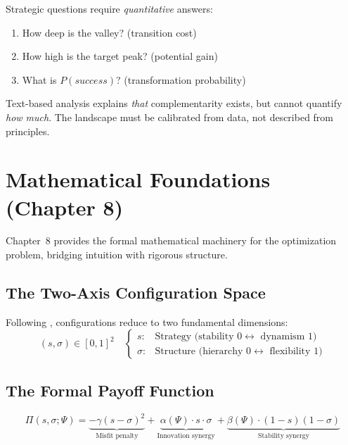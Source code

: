 Strategic questions require \textit{quantitative} answers:
\begin{enumerate}[nosep]
\item How deep is the valley? (transition cost)
\item How high is the target peak? (potential gain)
\item What is $P(success)$? (transformation probability)
\end{enumerate}

Text-based analysis explains \textit{that} complementarity exists, but cannot quantify \textit{how much}.
The landscape must be calibrated from data, not described from principles.

\section{Mathematical Foundations (Chapter 8)}
\label{sec:mp-mathematical}

Chapter~8 provides the formal mathematical machinery for the optimization problem,
bridging intuition with rigorous structure.

\subsection{The Two-Axis Configuration Space}

Following \citet{roberts2004}, configurations reduce to two fundamental dimensions:
\begin{equation}
\boxed{
(s, \sigma) \in [0,1]^2
\quad \begin{cases}
s: & \text{Strategy (stability } 0 \leftrightarrow \text{ dynamism } 1\text{)} \\
\sigma: & \text{Structure (hierarchy } 0 \leftrightarrow \text{ flexibility } 1\text{)}
\end{cases}
}
\label{eq:mp-config-space}
\end{equation}

\subsection{The Formal Payoff Function}

\begin{equation}
\boxed{
\Pi(s, \sigma; \Psi) = \underbrace{-\gamma (s - \sigma)^2}_{\text{Misfit penalty}}
                      + \underbrace{\alpha(\Psi) \cdot s \cdot \sigma}_{\text{Innovation synergy}}
                      + \underbrace{\beta(\Psi) \cdot (1-s)(1-\sigma)}_{\text{Stability synergy}}
}
\label{eq:mp-payoff-formal}
\end{equation}

